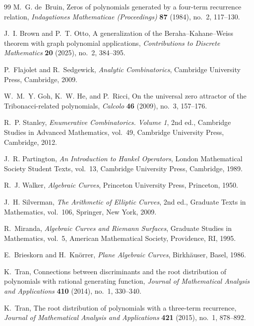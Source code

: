 \begin{thebibliography}{99}
M.~G. de~Bruin,
\newblock Zeros of polynomials generated by a four-term recurrence relation,
\newblock \emph{Indagationes Mathematicae (Proceedings)} \textbf{87} (1984), no.~2, 117--130.

J.~I. Brown and P.~T. Otto,
\newblock A generalization of the Beraha--Kahane--Weiss theorem with graph polynomial applications,
\newblock \emph{Contributions to Discrete Mathematics} \textbf{20} (2025), no.~2, 384--395.

P.~Flajolet and R.~Sedgewick,
\newblock \emph{Analytic Combinatorics},
\newblock Cambridge University Press, Cambridge, 2009.

W.~M.~Y. Goh, K.~W. He, and P.~Ricci,
\newblock On the universal zero attractor of the Tribonacci-related polynomials,
\newblock \emph{Calcolo} \textbf{46} (2009), no.~3, 157--176.

R.~P. Stanley,
\newblock \emph{Enumerative Combinatorics. Volume 1},
\newblock 2nd ed., Cambridge Studies in Advanced Mathematics, vol.~49, Cambridge University Press, Cambridge, 2012.

J.~R. Partington,
\newblock \emph{An Introduction to Hankel Operators},
\newblock London Mathematical Society Student Texts, vol.~13, Cambridge University Press, Cambridge, 1989.

R.~J. Walker,
\newblock \emph{Algebraic Curves},
\newblock Princeton University Press, Princeton, 1950.

J.~H. Silverman,
\newblock \emph{The Arithmetic of Elliptic Curves},
\newblock 2nd ed., Graduate Texts in Mathematics, vol.~106, Springer, New York, 2009.

R.~Miranda,
\newblock \emph{Algebraic Curves and Riemann Surfaces},
\newblock Graduate Studies in Mathematics, vol.~5, American Mathematical Society, Providence, RI, 1995.

E.~Brieskorn and H.~Kn\"orrer,
\newblock \emph{Plane Algebraic Curves},
\newblock Birkh\"auser, Basel, 1986.

K.~Tran,
\newblock Connections between discriminants and the root distribution of polynomials with rational generating function,
\newblock \emph{Journal of Mathematical Analysis and Applications} \textbf{410} (2014), no.~1, 330--340.

K.~Tran,
\newblock The root distribution of polynomials with a three-term recurrence,
\newblock \emph{Journal of Mathematical Analysis and Applications} \textbf{421} (2015), no.~1, 878--892.


\end{thebibliography}
